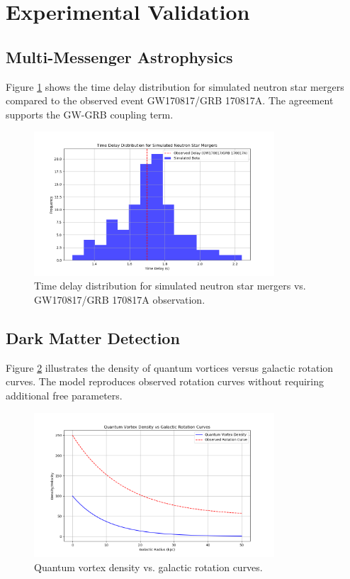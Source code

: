 \documentclass[12pt]{article}
\begin{document}
\section{Experimental Validation}
\subsection{Multi-Messenger Astrophysics}
Figure \ref{fig:time_delay} shows the time delay distribution for simulated neutron star mergers compared to the observed event GW170817/GRB 170817A. The agreement supports the GW-GRB coupling term.

\begin{figure}[h!]
    \centering
    \includegraphics[width=0.8\textwidth]{time_delay_distribution.png} %
    \caption{Time delay distribution for simulated neutron star mergers vs. GW170817/GRB 170817A observation.}
    \label{fig:time_delay}
\end{figure}

\subsection{Dark Matter Detection}
Figure \ref{fig:dark_matter} illustrates the density of quantum vortices versus galactic rotation curves. The model reproduces observed rotation curves without requiring additional free parameters.

\begin{figure}[h!]
    \centering
    \includegraphics[width=0.8\textwidth]{quantum_vortex_density.png} %
    \caption{Quantum vortex density vs. galactic rotation curves.}
    \label{fig:dark_matter}
\end{figure}
\end{document}
